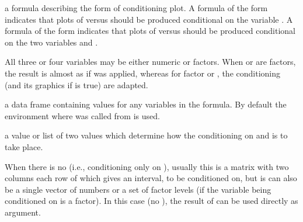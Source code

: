 \begin{Arguments}
\begin{ldescription}
\item[\code{formula}] a formula describing the form of conditioning plot.  A
formula of the form  indicates that plots of
 versus  should be produced conditional on the
variable .  A formula of the form 
indicates that plots of  versus  should be produced
conditional on the two variables  and .

All three or four variables may be either numeric or factors.
When  or  are factors, the result is almost as if
 was applied, whereas for factor
 or , the conditioning (and its graphics if
 is true) are adapted.

\item[\code{data}] a data frame containing values for any variables in the
formula.  By default the environment where  was called
from is used.
\item[\code{given.values}] a value or list of two values which determine how
the conditioning on  and  is to take place.

When there is no  (i.e., conditioning only on ),
usually this is a matrix with two columns each row of which gives an
interval, to be conditioned on, but is can also be a single vector
of numbers or a set of factor levels (if the variable being
conditioned on is a factor). In this case (no ),
the result of  can be used directly as
 argument.


\end{ldescription}
\end{Arguments}
